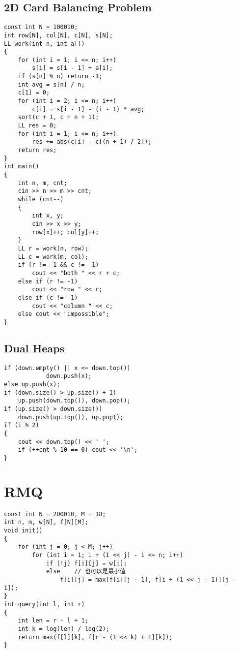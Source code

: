 \subsection{2D Card Balancing Problem}
\begin{lstlisting}
const int N = 100010;
int row[N], col[N], c[N], s[N];
LL work(int n, int a[])
{
    for (int i = 1; i <= n; i++)
        s[i] = s[i - 1] + a[i];
    if (s[n] % n) return -1;
    int avg = s[n] / n;
    c[1] = 0;
    for (int i = 2; i <= n; i++)
        c[i] = s[i - 1] - (i - 1) * avg;
    sort(c + 1, c + n + 1);
    LL res = 0;
    for (int i = 1; i <= n; i++)
        res += abs(c[i] - c[(n + 1) / 2]);
    return res;
}
int main()
{
    int n, m, cnt;
    cin >> n >> m >> cnt;
    while (cnt--)
    {
        int x, y;
        cin >> x >> y;
        row[x]++; col[y]++;
    }
    LL r = work(n, row);
    LL c = work(m, col);
    if (r != -1 && c != -1)
        cout << "both " << r + c;
    else if (r != -1)
        cout << "row " << r;
    else if (c != -1)
        cout << "column " << c;
    else cout << "impossible";
}
\end{lstlisting}
\subsection{Dual Heaps}
\begin{lstlisting}
if (down.empty() || x <= down.top())
            down.push(x);
else up.push(x);
if (down.size() > up.size() + 1)
    up.push(down.top()), down.pop();
if (up.size() > down.size())
    down.push(up.top()), up.pop();
if (i % 2)
{
    cout << down.top() << ' ';
    if (++cnt % 10 == 0) cout << '\n';
}
\end{lstlisting}
\section{RMQ}
\begin{lstlisting}
const int N = 200010, M = 18;
int n, m, w[N], f[N][M];
void init()
{
    for (int j = 0; j < M; j++)
        for (int i = 1; i + (1 << j) - 1 <= n; i++)
            if (!j) f[i][j] = w[i];
            else    // 也可以是最小值
                f[i][j] = max(f[i][j - 1], f[i + (1 << j - 1)][j - 1]);
}
int query(int l, int r)
{
    int len = r - l + 1;
    int k = log(len) / log(2);
    return max(f[l][k], f[r - (1 << k) + 1][k]);
}
\end{lstlisting}
